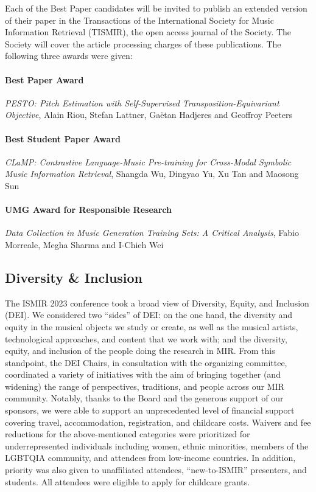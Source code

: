 Each of the Best Paper candidates will be invited to publish an extended version of their paper in the Transactions of the International Society for Music Information Retrieval (TISMIR), the open access journal of the Society. The Society will cover the article processing charges of these publications. The following three awards were given:

\paragraph*{Best Paper Award}

\emph{PESTO: Pitch Estimation with Self-Supervised Transposition-Equivariant Objective}, 
Alain Riou, Stefan Lattner, Gaëtan Hadjeres and Geoffroy Peeters

\paragraph*{Best Student Paper Award}

\emph{CLaMP: Contrastive Language-Music Pre-training for Cross-Modal Symbolic Music Information Retrieval}, 
Shangda Wu, Dingyao Yu, Xu Tan and Maosong Sun

\paragraph*{UMG Award for Responsible Research}

\emph{Data Collection in Music Generation Training Sets: A Critical Analysis},
Fabio Morreale, Megha Sharma and I-Chieh Wei


\subsection*{Diversity \& Inclusion}
The ISMIR 2023 conference took a broad view of Diversity, Equity, and Inclusion (DEI). We considered two ``sides'' of DEI: on the one hand, the diversity and equity in the musical objects we study or create, as well as the musical artists, technological approaches, and content that we work with;
and the diversity, equity, and inclusion of the people doing the research in MIR.
From this standpoint, the DEI Chairs, in consultation with the organizing committee, coordinated a variety of initiatives with the aim of bringing together (and widening) the range of perspectives, traditions, and people across our MIR community.
Notably, thanks to the Board and the generous support of our sponsors, we were able to support an unprecedented level of financial support covering travel, accommodation, registration, and childcare costs.
Waivers and fee reductions for the above-mentioned categories were prioritized for underrepresented individuals including women, ethnic minorities, members of the LGBTQIA community, and attendees from low-income countries. In addition, priority was also given to unaffiliated attendees, ``new-to-ISMIR'' presenters, and students. 
All attendees were eligible to apply for childcare grants.


